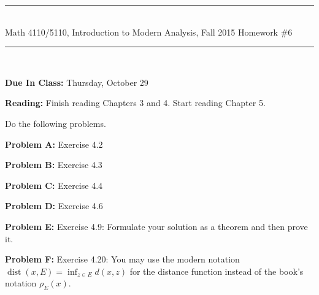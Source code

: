 \documentclass[11pt,reqno]{amsart}
\newcommand{\spacer}{\vspace{.4cm}}
\newcommand{\dist}{\mathop\mathrm{dist}\nolimits}
\begin{document}
\begin{center}
\hrule \ \\
\large \textsf{Math 4110/5110, Introduction to Modern Analysis, Fall 2015} \hfill
\Large Homework \#6 \vspace{.25cm} \hrule \
\end{center}

\spacer

\textbf{Due In Class:} Thursday, October 29  \spacer

\textbf{Reading:} Finish reading Chapters 3 and 4. Start reading Chapter 5.  \spacer

Do the following problems. \spacer

\textbf{Problem A:} Exercise 4.2 \spacer

\textbf{Problem B:} Exercise 4.3  \spacer

\textbf{Problem C:} Exercise 4.4  \spacer

\textbf{Problem D:} Exercise 4.6 \spacer

\textbf{Problem E:} Exercise 4.9: Formulate your solution as a theorem and then prove it. \spacer

\textbf{Problem F:} Exercise 4.20: You may use the modern notation $\dist(x,E) = \inf_{z\in E} d(x,z)$ for the distance function instead of the book's notation $\rho_E(x)$.
\end{document}
